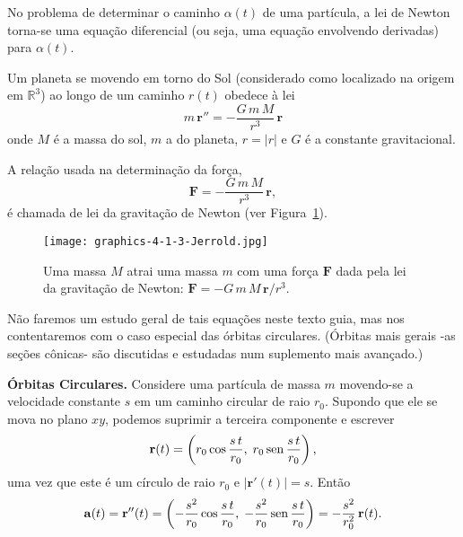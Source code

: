 No problema de determinar o caminho $\alpha(t)$ de uma partícula, a lei de Newton torna-se uma equação diferencial (ou seja, uma equação envolvendo
derivadas) para $\alpha(t)$.

\begin{exem}
Um planeta se movendo em torno do Sol (considerado como localizado na origem em $\mathbb{R}^{3}$) ao longo de um caminho $r(t)$ obedece à lei
\begin{equation*}
  m\, \mathbf{r}''=-\frac{G\, m\, M}{r^{3}}\, \mathbf{r}
\end{equation*}
onde $M$ é a massa do sol, $m$ a do planeta, $r = |r|$ e $G$ é a constante gravitacional.
\end{exem}

\solo
A relação usada na determinação da força,
\begin{equation*}
\mathbf{F} = -\frac{G\,m\, M}{r^{3}}\,\mathbf{r},
\end{equation*}
é chamada de lei da gravitação de Newton (ver Figura~\ref{fig:4-1-3-jerrold}).

\begin{figure}[h!]
  \centering
  \texttt{[image: graphics-4-1-3-Jerrold.jpg]}
\caption{Uma massa \(M\) atrai uma massa \(m\) com uma força \(\mathbf{F}\) dada pela lei da gravitação de Newton:
\(\mathbf{F} = -G\,m\,M\, \mathbf{r}/r^{3}\).}
  \label{fig:4-1-3-jerrold}
\end{figure}


Não faremos um estudo geral de tais equações neste texto guia, mas nos contentaremos com o caso especial das órbitas circulares.
(Órbitas mais gerais -as seções cônicas- são discutidas e estudadas num suplemento mais avançado.)

\noindent\textbf{Órbitas Circulares.}
Considere uma partícula de massa $m$ movendo-se a velocidade constante $s$ em um caminho circular de raio $r_{0}$. Supondo que ele se mova no plano
$xy$, podemos suprimir a terceira componente e escrever
\begin{equation*}
\mathbf{r}(t)=\left(r_{0}\cos \dfrac{s\, t}{r_{0}}, \; r_{0}\operatorname{sen} \dfrac{s\,t}{r_{0}}\right),
\end{equation*}
uma vez que este é um círculo de raio $r_{0}$ e $|\mathbf{r}'(t)|=s$. Então
\begin{equation*}
\mathbf{a}(t)=\mathbf{r}''(t)=\left(-\frac{s^{2}}{r_{0}}\cos \frac{s\,t}{r_{0}}, \; -\frac{s^{2}}{r_{0}}\operatorname{sen} \frac{s\,t}{r_{0}} \right)= -\frac{s^{2}}{r_{0}^{2}}\, \mathbf{r}(t).
\end{equation*}

